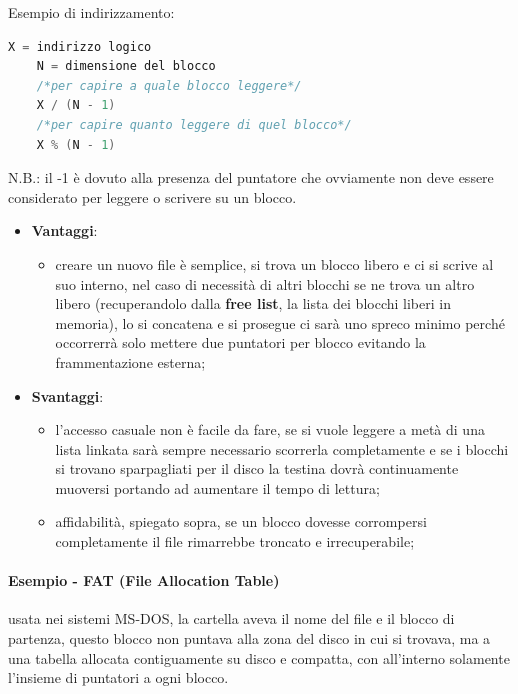 \documentclass[a4paper, 12pt]{book}
\begin{document}
Esempio di indirizzamento:
\begin{lstlisting}[language=C]
    X = indirizzo logico
    N = dimensione del blocco
    /*per capire a quale blocco leggere*/
    X / (N - 1)
    /*per capire quanto leggere di quel blocco*/
    X % (N - 1)
\end{lstlisting}
N.B.: il -1 è dovuto alla presenza del puntatore che ovviamente 
non deve essere considerato per leggere o scrivere su un blocco.
\begin{itemize}
    \item \textbf{Vantaggi}:
    \begin{itemize}
        \item creare un nuovo file è semplice, si trova un 
        blocco libero e ci si scrive al suo interno, nel caso 
        di necessità di altri blocchi se ne trova un altro 
        libero (recuperandolo dalla \textbf{free list}, la 
        lista dei blocchi liberi in memoria), lo si 
        concatena e si prosegue ci sarà uno spreco minimo 
        perché occorrerrà solo mettere due puntatori per blocco
        evitando la frammentazione esterna;
    \end{itemize}
    \item \textbf{Svantaggi}:
    \begin{itemize}
        \item l'accesso casuale non è facile da fare, se 
        si vuole leggere a metà di una lista linkata 
        sarà sempre necessario scorrerla completamente e 
        se i blocchi si trovano sparpagliati per il disco 
        la testina dovrà continuamente muoversi portando 
        ad aumentare il tempo di lettura;
        \item affidabilità, spiegato sopra, se un blocco dovesse 
        corrompersi completamente il file rimarrebbe troncato 
        e irrecuperabile;
    \end{itemize}
\end{itemize}
\paragraph{Esempio - FAT (File Allocation Table)} usata nei 
sistemi MS-DOS, la cartella aveva il nome del file e il blocco di partenza, 
questo blocco non puntava alla zona del disco in cui si trovava, 
ma a una tabella allocata contiguamente su disco e compatta, con 
all'interno solamente l'insieme di puntatori a ogni blocco.
\end{document}
